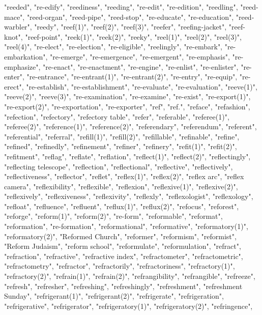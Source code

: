 "reeded",
"re-edify",
"reediness",
"reeding",
"re-edit",
"re-edition",
"reedling",
"reed-mace",
"reed-organ",
"reed-pipe",
"reed-stop",
"re-educate",
"re-education",
"reed-warbler",
"reedy",
"reef(1)",
"reef(2)",
"reef(3)",
"reefer",
"reefing-jacket",
"reef-knot",
"reef-point",
"reek(1)",
"reek(2)",
"reeky",
"reel(1)",
"reel(2)",
"reel(3)",
"reel(4)",
"re-elect",
"re-election",
"re-eligible",
"reelingly",
"re-embark",
"re-embarkation",
"re-emerge",
"re-emergence",
"re-emergent",
"re-emphasis",
"re-emphasize",
"re-enact",
"re-enactment",
"re-engine",
"re-enlist",
"re-enlister",
"re-enter",
"re-entrance",
"re-entrant(1)",
"re-entrant(2)",
"re-entry",
"re-equip",
"re-erect",
"re-establish",
"re-establishment",
"re-evaluate",
"re-evaluation",
"reeve(1)",
"reeve(2)",
"reeve(3)",
"re-examination",
"re-examine",
"re-exist",
"re-export(1)",
"re-export(2)",
"re-exportation",
"re-exporter",
"ref",
"ref.",
"reface",
"refashion",
"refection",
"refectory",
"refectory table",
"refer",
"referable",
"referee(1)",
"referee(2)",
"reference(1)",
"reference(2)",
"referendary",
"referendum",
"referent",
"referential",
"referral",
"refill(1)",
"refill(2)",
"refillable",
"refinable",
"refine",
"refined",
"refinedly",
"refinement",
"refiner",
"refinery",
"refit(1)",
"refit(2)",
"refitment",
"reflag",
"reflate",
"reflation",
"reflect(1)",
"reflect(2)",
"reflectingly",
"reflecting telescope",
"reflection",
"reflectional",
"reflective",
"reflectively",
"reflectiveness",
"reflector",
"reflet",
"reflex(1)",
"reflex(2)",
"reflex arc",
"reflex camera",
"reflexibility",
"reflexible",
"reflexion",
"reflexive(1)",
"reflexive(2)",
"reflexively",
"reflexiveness",
"reflexivity",
"reflexly",
"reflexologist",
"reflexology",
"refloat",
"refluence",
"refluent",
"reflux(1)",
"reflux(2)",
"refocus",
"reforest",
"reforge",
"reform(1)",
"reform(2)",
"re-form",
"reformable",
"reformat",
"reformation",
"re-formation",
"reformational",
"reformative",
"reformatory(1)",
"reformatory(2)",
"Reformed Church",
"reformer",
"reformism",
"reformist",
"Reform Judaism",
"reform school",
"reformulate",
"reformulation",
"refract",
"refraction",
"refractive",
"refractive index",
"refractometer",
"refractometric",
"refractometry",
"refractor",
"refractorily",
"refractoriness",
"refractory(1)",
"refractory(2)",
"refrain(1)",
"refrain(2)",
"refrangibility",
"refrangible",
"refreeze",
"refresh",
"refresher",
"refreshing",
"refreshingly",
"refreshment",
"refreshment Sunday",
"refrigerant(1)",
"refrigerant(2)",
"refrigerate",
"refrigeration",
"refrigerative",
"refrigerator",
"refrigeratory(1)",
"refrigeratory(2)",
"refringence",
